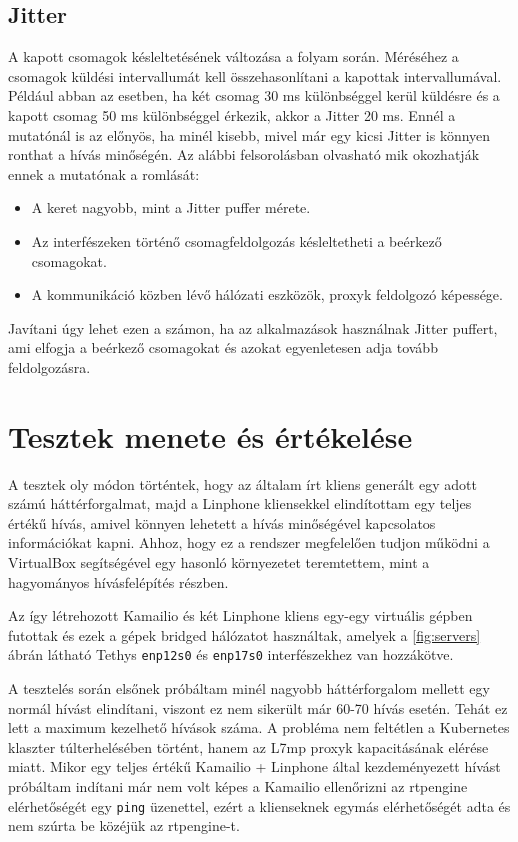 \subsection{Jitter}

A kapott csomagok késleltetésének változása a folyam során. Méréséhez a csomagok küldési 
intervallumát kell összehasonlítani a kapottak intervallumával. Például abban az esetben, 
ha két csomag 30 ms különbséggel kerül küldésre és a kapott csomag 50 ms különbséggel 
érkezik, akkor a Jitter 20 ms. Ennél a mutatónál is az előnyös, ha minél kisebb, mivel 
már egy kicsi Jitter is könnyen ronthat a hívás minőségén. Az alábbi felsorolásban 
olvasható mik okozhatják ennek a mutatónak a romlását:

\begin{itemize}
	\item A keret nagyobb, mint a Jitter puffer mérete. 
	\item Az interfészeken történő csomagfeldolgozás késleltetheti a beérkező csomagokat.
	\item A kommunikáció közben lévő hálózati eszközök, proxyk feldolgozó képessége. 
\end{itemize}

Javítani úgy lehet ezen a számon, ha az alkalmazások használnak Jitter puffert, ami 
elfogja a beérkező csomagokat és azokat egyenletesen adja tovább feldolgozásra. 

\section{Tesztek menete és értékelése}

A tesztek oly módon történtek, hogy az általam írt kliens generált egy adott számú 
háttérforgalmat, majd a Linphone kliensekkel elindítottam egy teljes értékű hívás, amivel 
könnyen lehetett a hívás minőségével kapcsolatos információkat kapni. Ahhoz, hogy ez a 
rendszer megfelelően tudjon működni a VirtualBox segítségével egy hasonló környezetet 
teremtettem, mint a hagyományos hívásfelépítés részben.

Az így létrehozott Kamailio és két Linphone kliens egy-egy virtuális gépben futottak és 
ezek a gépek bridged hálózatot használtak, amelyek a \ref{fig:servers} ábrán látható 
Tethys \texttt{enp12s0} és \texttt{enp17s0} interfészekhez van hozzákötve. 

A tesztelés során elsőnek próbáltam minél nagyobb háttérforgalom mellett egy normál 
hívást elindítani, viszont ez nem sikerült már 60-70 hívás esetén. Tehát ez lett a 
maximum kezelhető hívások száma. A probléma nem feltétlen a Kubernetes klaszter 
túlterhelésében történt, hanem az L7mp proxyk kapacitásának elérése miatt. Mikor egy 
teljes értékű Kamailio + Linphone által kezdeményezett hívást próbáltam indítani már nem 
volt képes a Kamailio ellenőrizni az rtpengine elérhetőségét egy \texttt{ping} üzenettel, 
ezért a klienseknek egymás elérhetőségét adta és nem szúrta be közéjük az rtpengine-t.

